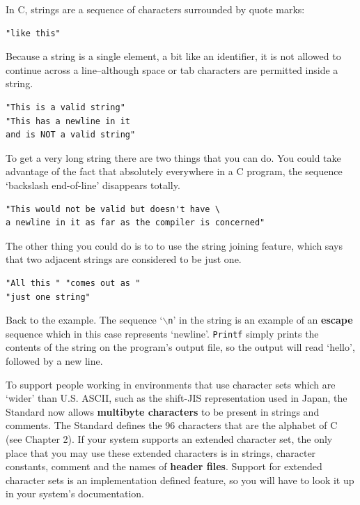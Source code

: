    In C, strings are a sequence of characters surrounded by quote marks:


   \begin{Verbatim}
"like this"
\end{Verbatim}

   Because a string is a single element, a bit like an identifier, it is not
    allowed to continue across a line--although space or tab characters
    are permitted inside a string.


   \begin{Verbatim}
"This is a valid string"
"This has a newline in it
and is NOT a valid string"
\end{Verbatim}

   To get a very long string there are two things that you can do. You could
    take advantage of the fact that absolutely everywhere in a C program, the
    sequence `backslash end-of-line' disappears totally.


   \begin{Verbatim}
"This would not be valid but doesn't have \
a newline in it as far as the compiler is concerned"
\end{Verbatim}

   The other thing you could do is to to use the string joining feature,
    which says that two adjacent strings are considered to be just one.


   \begin{Verbatim}
"All this " "comes out as "
"just one string"
\end{Verbatim}

   Back to the example. The sequence `\texttt{$\backslash$n}' in the
    string is an example of an \textbf{escape} sequence which in this case
    represents `newline'. \texttt{Printf} simply prints the
    contents of the string on the program's output file, so the output will
    read `hello', followed by a new line.


   To support people working in environments that use character sets which
    are `wider' than U.S. ASCII, such as the shift-JIS representation
    used in Japan, the Standard now allows \textbf{multibyte characters} to
    be present in strings and comments. The Standard defines the
    96 characters that are the alphabet of C (see Chapter 2). If your system supports an extended character set, the only
    place that you may use these extended characters is in strings, character
    constants, comment and the names of \textbf{header files}. Support for
    extended character sets is an implementation defined feature, so you will
    have to look it up in your system's documentation.


